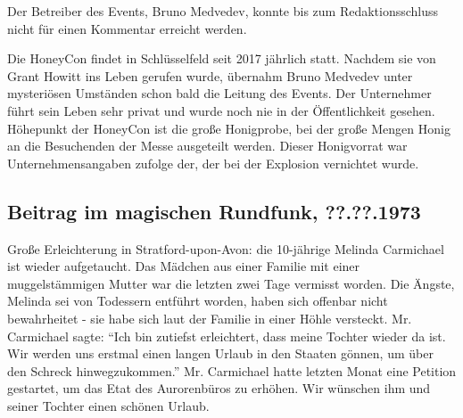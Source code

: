 \documentclass[final]{multiversum}
\begin{document}
Der Betreiber des Events, Bruno Medvedev, konnte bis zum Redaktionsschluss nicht für einen Kommentar erreicht werden.

Die HoneyCon findet in Schlüsselfeld seit 2017 jährlich statt. 
Nachdem sie von Grant Howitt ins Leben gerufen wurde, übernahm Bruno Medvedev unter mysteriösen Umständen schon bald die Leitung des Events. 
Der Unternehmer führt sein Leben sehr privat und wurde noch nie in der Öffentlichkeit gesehen. 
Höhepunkt der HoneyCon ist die große Honigprobe, bei der große Mengen Honig an die Besuchenden der Messe ausgeteilt werden. 
Dieser Honigvorrat war Unternehmensangaben zufolge der, der bei der Explosion vernichtet wurde.

\subsection{Beitrag im magischen Rundfunk, ??.??.1973}
Große Erleichterung in Stratford-upon-Avon: die 10-jährige Melinda Carmichael ist wieder aufgetaucht. 
Das Mädchen aus einer Familie mit einer muggelstämmigen Mutter war die letzten zwei Tage vermisst worden. 
Die Ängste, Melinda sei von Todessern entführt worden, haben sich offenbar nicht bewahrheitet - sie habe sich laut der Familie in einer Höhle versteckt. 
Mr. Carmichael sagte: \enquote{Ich bin zutiefst erleichtert, dass meine Tochter wieder da ist. 
Wir werden uns erstmal einen langen Urlaub in den Staaten gönnen, um über den Schreck hinwegzukommen.}
Mr. Carmichael hatte letzten Monat eine Petition gestartet, um das Etat des Aurorenbüros zu erhöhen. 
Wir wünschen ihm und seiner Tochter einen schönen Urlaub. 
\end{document}
